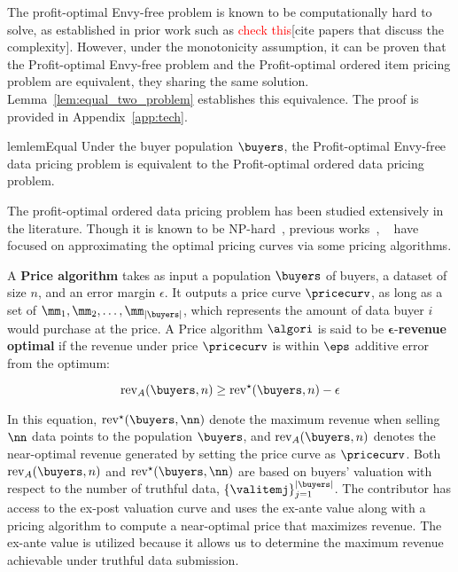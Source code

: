 The profit-optimal Envy-free problem is known to be computationally hard to solve, as established in prior work such as \textcolor{red}{check this}[cite papers that discuss the complexity]. However, under the monotonicity assumption, it can be proven that the Profit-optimal Envy-free problem and the Profit-optimal ordered item pricing problem are equivalent, they sharing the same solution. Lemma~\ref{lem:equal_two_problem} establishes this equivalence. The proof is provided in Appendix~\ref{app:tech}.



\begin{restatable}{lem}{lemEqual} 
\label{lem:equal_two_problem}
Under the buyer population $\buyers$, the Profit-optimal Envy-free data pricing problem is equivalent to the Profit-optimal ordered data pricing problem.
\end{restatable}

The profit-optimal ordered data pricing problem has been studied extensively in the literature. Though it is known to be NP-hard~\citep{chawla2022pricing}, previous works~\citep{chawla2022pricing}, ~\citep{chen2024learning} have focused on approximating the optimal pricing curves via some pricing algorithms.


A \textbf{Price algorithm} takes as input a population $\buyers$ of buyers, a dataset of size $n$, and an error margin \( \epsilon \). It outputs a price curve $\pricecurv$, as long as a set of \( \mm_1, \mm_2, \ldots, \mm_{|\buyers|} \), which represents the amount of data buyer \( i \) would purchase at the price. A Price algorithm \( \algori \) is said to be \( \mathbf{\epsilon} \)-\textbf{revenue optimal} if the revenue under price $\pricecurv$ is within $\eps$ additive error from the optimum:

\[
\mathrm{rev}_{A}(\buyers, n) \geq \mathrm{rev}^{\star} (\buyers,n)- \epsilon
\]

In this equation,  $\mathrm{rev}^{\star}(\buyers, \nn)$ denote the maximum revenue when selling $\nn$ data points to the population $\buyers$, and $ \mathrm{rev}_A(\buyers,n) $ denotes the near-optimal revenue generated by setting the price curve as $\pricecurv$. Both $  \mathrm{rev}_A(\buyers,n)$ and  $\mathrm{rev}^{\star} (\buyers, \nn)$ are based on  buyers' valuation with respect to the number of truthful data, $\left\{\valitemj \right\}_{j= 1}^{|\buyers|}$. The contributor has access to the ex-post valuation curve and uses the ex-ante value along with a pricing algorithm to compute a near-optimal price that maximizes revenue. The ex-ante value is utilized because it allows us to determine the maximum revenue achievable under truthful data submission.


